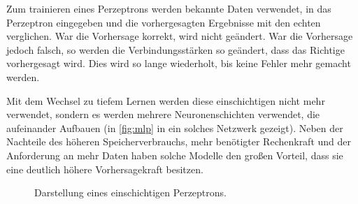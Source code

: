 			Zum trainieren eines Perzeptrons werden bekannte Daten verwendet, in das Perzeptron eingegeben und die vorhergesagten Ergebnisse mit den echten verglichen. War die Vorhersage korrekt, wird nicht geändert. War die Vorhersage jedoch falsch, so werden die Verbindungsstärken so geändert, dass das Richtige vorhergesagt wird. Dies wird so lange wiederholt, bis keine Fehler mehr gemacht werden.

			Mit dem Wechsel zu tiefem Lernen werden diese einschichtigen nicht mehr verwendet, sondern es werden mehrere Neuronenschichten verwendet, die aufeinander Aufbauen (in \autoref{fig:mlp} in ein solches Netzwerk gezeigt). Neben der Nachteile des höheren Speicherverbrauchs, mehr benötigter Rechenkraft und der Anforderung an mehr Daten haben solche Modelle den großen Vorteil, dass sie eine deutlich höhere Vorhersagekraft besitzen.

			\begin{figure}
				\centering
				\caption{Darstellung eines einschichtigen Perzeptrons.}
				\label{fig:perceptron}
			\end{figure}


